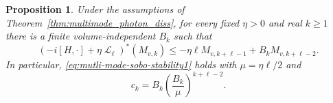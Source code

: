 \documentclass[11pt]{article}
\theoremstyle{myplain}
\newtheorem{prop}[prop]{Proposition}
\theoremstyle{mydefinition}
\theoremstyle{remark}
\DeclareMathOperator{\cL}{\mathcal{L}}
\DeclareMathOperator{\1}{\mathds{1}}
\begin{document}
        \begin{prop}\label{appx-thm:multimode_photon_diss}
            Under the assumptions of Theorem~\ref{thm:multimode_photon_diss}, for every fixed $\eta>0$ and real $k\ge1$ there is a finite volume-independent $B_k$ such that
            \begin{equation}\label{eq:multimode-preabsorption-core}
                (-i[H,\cdot]+\eta\cL_\ell)^*(M_{v,k})
                \le-\eta\ell M_{v,k+\ell-1}+B_kM_{v,k+\ell-2}.
            \end{equation}
            In particular, \eqref{eq:mutli-mode-sobo-stability1} holds with $\mu=\eta\ell/2$ and
            \begin{equation}\label{eq:multimode-core-constant}
                c_k=B_k\left(\frac{B_k}{\mu}\right)^{k+\ell-2}.
            \end{equation}
        \end{prop}
\end{document}
